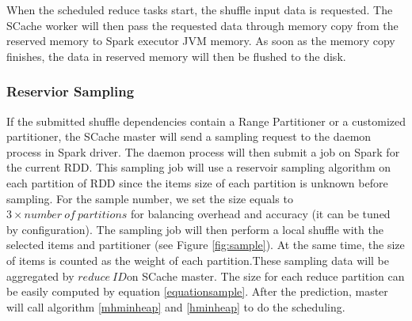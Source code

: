 When the scheduled reduce tasks start, the shuffle input data is requested. The SCache worker will then pass the requested data through memory copy from the reserved memory to Spark executor JVM memory. As soon as the memory copy finishes, the data in reserved memory will then be flushed to the disk.

\subsubsection{Reservior Sampling}\label{sampling}
If the submitted shuffle dependencies contain a Range Partitioner or a customized partitioner, the SCache master will send a sampling request to the daemon process in Spark driver. The daemon process will then submit a job on Spark for the current RDD. This sampling job will use a reservoir sampling algorithm\cite{reservoir} on each partition of RDD since the items size of each partition is unknown before sampling. For the sample number, we set the size equals to $3 \times number\ of\ partitions$ for balancing overhead and accuracy (it can be tuned by configuration). The sampling job will then perform a local shuffle with the selected items and partitioner (see Figure \ref{fig:sample}). At the same time, the size of items is counted as the weight of each partition.These sampling data will be aggregated by $reduce\ ID$on SCache master. The size for each reduce partition can be easily computed by equation \ref{equationsample}. After the prediction, master will call algorithm \ref{mhminheap} and \ref{hminheap} to do the scheduling. 

